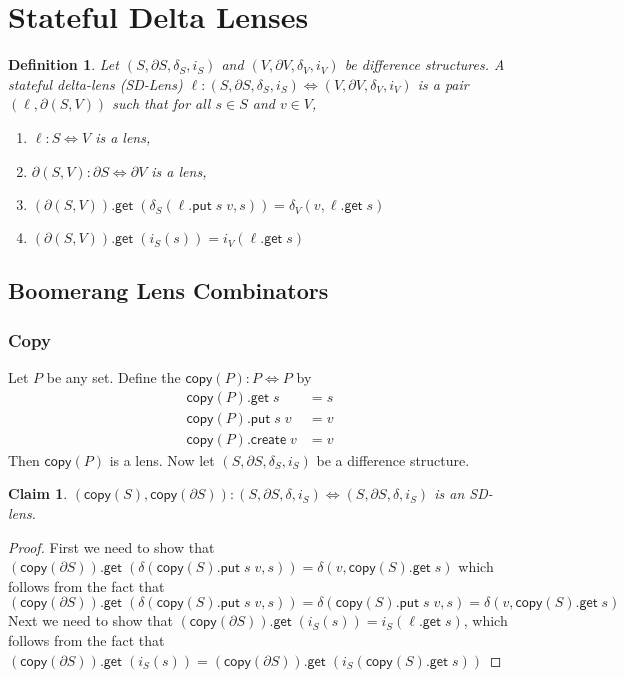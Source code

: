 \documentclass[acmsmall,review,anonymous]{acmart}\settopmatter{printfolios=true,printccs=false,printacmref=false}
\newtheorem{definition}{Definition}
\newtheorem{claim}{Claim}
\newcommand{\kw}[1]{\ensuremath{\mathsf{#1}}\xspace}
\newcommand{\get}{\ensuremath{\kw{get}}\xspace}
\newcommand{\pput}{\ensuremath{\kw{put}}\xspace}
\newcommand{\create}{\ensuremath{\kw{create}}\xspace}
\newcommand{\ccopy}{\ensuremath{\kw{copy}}\xspace}
\begin{document}
\section{Stateful Delta Lenses}
\begin{definition}
Let $(S, \partial S, \delta_S, i_S)$ and $(V, \partial V, \delta_V, i_V)$ be
difference structures. A stateful delta-lens (SD-Lens) $\ell : (S, \partial S,
\delta_S, i_S) \Leftrightarrow (V, \partial V, \delta_V, i_V)$ is a pair
$(\ell, \partial (S, V))$ such that for all $s \in S$ and $v \in V$,
\begin{enumerate}
  \item
  $\ell : S \Leftrightarrow V$ is a lens,
  \item
  $\partial(S, V) : \partial S \Leftrightarrow \partial V$ is a lens,
  \item
  $(\partial (S, V)).\get \; (\delta_S(\ell.\pput \; s \; v, s)) = \delta_V(v,
  \ell.\get \; s)$
  \item
  $(\partial (S, V)).\get \; (i_{S}(s)) = i_{V}(\ell.\get \; s)$
\end{enumerate}

\end{definition}
\subsection{Boomerang Lens Combinators}
\subsubsection{Copy}
Let $P$ be any set. Define the $\ccopy(P) : P \Leftrightarrow P$ by
\begin{align}
\ccopy(P).\get \; s &= s\\
\ccopy(P).\pput \; s \; v &= v\\
\ccopy(P).\create \; v &= v
\end{align}
Then $\ccopy(P)$ is a lens. Now let $(S, \partial S, \delta_S, i_S)$ be a
difference structure.
\begin{claim}
$(\ccopy(S),  \ccopy(\partial S)) : (S, \partial S, \delta, i_S)
\Leftrightarrow (S, \partial S, \delta, i_S)$ is an SD-lens.
\end{claim}
\begin{proof}
First we need to show that $(\ccopy(\partial S)).\get \; (\delta(\ccopy(S).\pput
\; s \; v, s)) = \delta(v, \ccopy(S).\get \; s)$ which follows from the fact that
$$ (\ccopy(\partial S)).\get \; (\delta(\ccopy(S).\pput \; s
\; v, s)) = \delta(\ccopy(S).\pput \; s \; v, s) = \delta(v, \ccopy(S).\get
\; s) $$
Next we need to show that $(\ccopy(\partial S)).\get \; (i_{S}(s)) =
i_{S}(\ell.\get \; s)$, which follows from the fact that $(\ccopy(\partial
S)).\get \; (i_{S}(s)) = (\ccopy(\partial S)).\get \; (i_{S}(\ccopy(S).\get \;
s))$
\end{proof}
\end{document}
